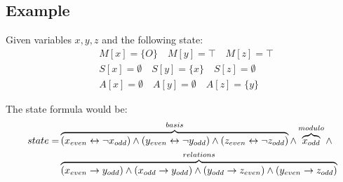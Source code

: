 \subsection*{Example}
Given variables $x,y,z$ and the following state:
\begin{align*}
&M[x] = \{O\} \quad M[y] = \top \quad M[z] = \top \\
&S[x] = \emptyset \quad S[y] = \{x\} \quad S[z] = \emptyset \\
&A[x] = \emptyset \quad A[y] = \emptyset \quad A[z] = \{y\}
\end{align*}

The state formula would be:
\begin{align*}
state =& \overbrace{(x_{even}\leftrightarrow\neg x_{odd})\land(y_{even}\leftrightarrow\neg y_{odd})\land(z_{even}\leftrightarrow\neg z_{odd})}^{basis} \land \overbrace{x_{odd}}^{modulo}\land \\
&\overbrace{(x_{even}\rightarrow y_{odd}) \land (x_{odd} \rightarrow y_{odd}) \land 
            (y_{odd} \rightarrow z_{even}) \land (y_{even} \rightarrow z_{odd})}^{relations}
\end{align*}